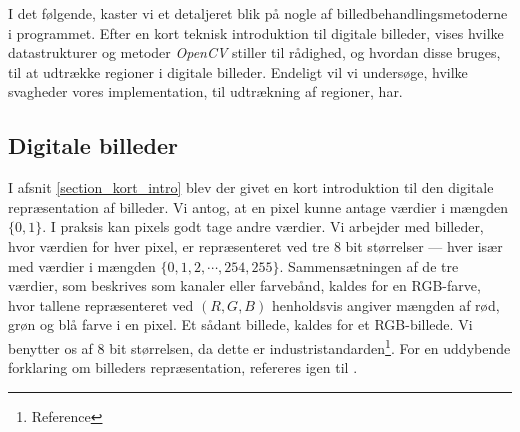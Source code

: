 {
{\sffamily I det følgende, kaster vi et detaljeret blik på nogle af
billedbehandlingsmetoderne i programmet. Efter en kort teknisk
introduktion til digitale billeder, vises hvilke datastrukturer og
metoder \emph{OpenCV} stiller til rådighed, og hvordan disse bruges, til
at udtrække regioner i digitale billeder. Endeligt vil vi undersøge,
hvilke svagheder vores implementation, til udtrækning af regioner, har.
}

\subsection{Digitale billeder}
I afsnit \ref{section_kort_intro} blev der givet en kort introduktion
til den digitale repræsentation af billeder. Vi antog, at en pixel kunne
antage værdier i mængden $\{0, 1\}$. I praksis kan pixels godt tage
andre værdier. Vi arbejder med billeder, hvor værdien for hver pixel, er
repræsenteret ved tre 8 bit størrelser --- hver især med værdier i mængden
$\{0, 1, 2, \cdots, 254, 255\}$. Sammensætningen af de tre værdier, som
beskrives som kanaler eller farvebånd, kaldes for en RGB-farve, hvor
tallene repræsenteret ved $(R,G,B)$ henholdsvis angiver mængden af rød,
grøn og blå farve i en pixel. Et sådant billede, kaldes for et
RGB-billede.  Vi benytter os af 8 bit størrelsen, da dette er
industristandarden\footnote{Reference}. For en uddybende forklaring om
billeders repræsentation, refereres igen til \cite{SIOlsen}.


}
